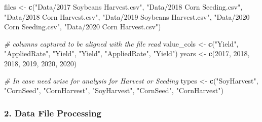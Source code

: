 \documentclass[
]{article}
\newenvironment{Shaded}{\begin{snugshade}}{\end{snugshade}}
\newcommand{\CommentTok}[1]{\textcolor[rgb]{0.56,0.35,0.01}{\textit{#1}}}
\newcommand{\DecValTok}[1]{\textcolor[rgb]{0.00,0.00,0.81}{#1}}
\newcommand{\FunctionTok}[1]{\textcolor[rgb]{0.13,0.29,0.53}{\textbf{#1}}}
\newcommand{\NormalTok}[1]{#1}
\newcommand{\OtherTok}[1]{\textcolor[rgb]{0.56,0.35,0.01}{#1}}
\newcommand{\StringTok}[1]{\textcolor[rgb]{0.31,0.60,0.02}{#1}}
\begin{document}
\begin{Shaded}
\begin{Highlighting}[]
\NormalTok{files }\OtherTok{\textless{}{-}} \FunctionTok{c}\NormalTok{(}\StringTok{"Data/2017 Soybeans Harvest.csv"}\NormalTok{,}
           \StringTok{"Data/2018 Corn Seeding.csv"}\NormalTok{,}
           \StringTok{"Data/2018 Corn Harvest.csv"}\NormalTok{,}
           \StringTok{"Data/2019 Soybeans Harvest.csv"}\NormalTok{,}
           \StringTok{"Data/2020 Corn Seeding.csv"}\NormalTok{,}
           \StringTok{"Data/2020 Corn Harvest.csv"}\NormalTok{)}

\CommentTok{\# columns captured to be aligned with the file read}
\NormalTok{value\_cols }\OtherTok{\textless{}{-}} \FunctionTok{c}\NormalTok{(}\StringTok{"Yield"}\NormalTok{, }\StringTok{"AppliedRate"}\NormalTok{, }\StringTok{"Yield"}\NormalTok{, }\StringTok{"Yield"}\NormalTok{, }\StringTok{"AppliedRate"}\NormalTok{, }\StringTok{"Yield"}\NormalTok{)}
\NormalTok{years }\OtherTok{\textless{}{-}} \FunctionTok{c}\NormalTok{(}\DecValTok{2017}\NormalTok{, }\DecValTok{2018}\NormalTok{, }\DecValTok{2018}\NormalTok{, }\DecValTok{2019}\NormalTok{, }\DecValTok{2020}\NormalTok{, }\DecValTok{2020}\NormalTok{)}

\CommentTok{\# In case need arise for analysis for Harvest or Seeding}
\NormalTok{types }\OtherTok{\textless{}{-}} \FunctionTok{c}\NormalTok{(}\StringTok{"SoyHarvest"}\NormalTok{, }\StringTok{"CornSeed"}\NormalTok{, }\StringTok{"CornHarvest"}\NormalTok{, }\StringTok{"SoyHarvest"}\NormalTok{, }\StringTok{"CornSeed"}\NormalTok{, }\StringTok{"CornHarvest"}\NormalTok{)}
\end{Highlighting}
\end{Shaded}

\subsubsection{2. Data File Processing}\label{data-file-processing}
\end{document}
